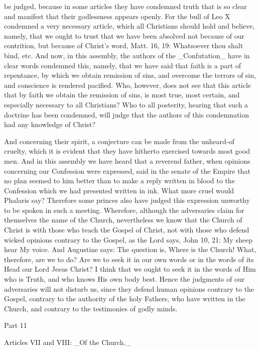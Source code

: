 be judged, because in some articles they have condemned truth that is
so clear and manifest that their godlessness appears openly.  For the
bull of Leo X condemned a very necessary article, which all
Christians should hold and believe, namely, that we ought to trust
that we have been absolved not because of our contrition, but because
of Christ's word, Matt. 16, 19: Whatsoever thou shalt bind, etc. And
now, in this assembly, the authors of the _Confutation_ have in clear
words condemned this, namely, that we have said that faith is a part
of repentance, by which we obtain remission of sins, and overcome the
terrors of sin, and conscience is rendered pacified.  Who, however,
does not see that this article that by faith we obtain the remission
of sins, is most true, most certain, and especially necessary to all
Christians?  Who to all posterity, hearing that such a doctrine has
been condemned, will judge that the authors of this condemnation had
any knowledge of Christ?

And concerning their spirit, a conjecture can be made from the
unheard-of cruelty, which it is evident that they have hitherto
exercised towards most good men.  And in this assembly we have heard
that a reverend father, when opinions concerning our Confession were
expressed, said in the senate of the Empire that no plan seemed to
him better than to make a reply written in blood to the Confession
which we had presented written in ink.  What more cruel would
Phalaris say?  Therefore some princes also have judged this
expression unworthy to be spoken in such a meeting.  Wherefore,
although the adversaries claim for themselves the name of the Church,
nevertheless we know that the Church of Christ is with those who
teach the Gospel of Christ, not with those who defend wicked opinions
contrary to the Gospel, as the Lord says, John 10, 21: My sheep hear
My voice.  And Augustine says: The question is, Where is the Church!
What, therefore, are we to do?  Are we to seek it in our own words or
in the words of its Head our Lord Jesus Christ?  I think that we
ought to seek it in the words of Him who is Truth, and who knows His
own body best.  Hence the judgments of our adversaries will not
disturb us, since they defend human opinions contrary to the Gospel,
contrary to the authority of the holy Fathers, who have written in
the Church, and contrary to the testimonies of godly minds.




Part 11


Articles VII and VIII: _Of the Church._

